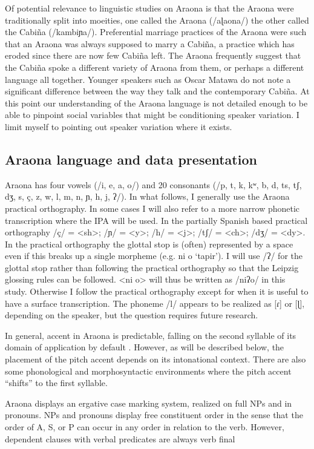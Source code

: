 \documentclass[output=paper,hidelinks]{langscibook}
\begin{document}
Of potential relevance to linguistic studies on Araona is that the Araona were traditionally split into moeities, one called the Araona (/aɭaona/) the other called the Cabiña (/kambiɲa/). Preferential marriage practices of the Araona were such that an Araona was always supposed to marry a Cabiña, a practice which has eroded since there are now few Cabiña left. The Araona frequently suggest that the Cabiña spoke a different variety of Araona from them, or perhaps a different language all together. Younger speakers such as Oscar Matawa do not note a significant difference between the way they talk and the contemporary Cabiña. At this point our understanding of the Araona language is not detailed enough to be able to pinpoint social variables that might be conditioning speaker variation. I limit myself to pointing out speaker variation where it exists. 


\subsection{Araona language and data presentation}

Araona has four vowels (/i, e, a, o/) and 20 consonants (/p, t, k, kʷ, b, d, ts, tʃ, dʒ, s, ç, z, w, l, m, n, ɲ, h, j, ʔ/). In what follows, I generally use the Araona practical orthography. In some cases I will also refer to a more narrow phonetic transcription where the IPA will be used. In the partially Spanish based practical orthography /ç/ = <sh>; /ɲ/  = <y>;  /h/ = <j>; /tʃ/ = <ch>; /dʒ/ = <dy>. In the practical orthography the glottal stop is (often) represented by a space even if this breaks up a single morpheme (e.g. ni o `tapir'). I will use /ʔ/ for the glottal stop rather than following the practical orthography so that the Leipzig glossing rules can be followed. <ni o> will thus be written as /niʔo/ in this study. Otherwise I follow the practical orthography except for when it is useful to have a surface transcription. The phoneme /l/ appears to be realized as [ɾ] or [ɭ], depending on the speaker, but the question requires future research. 

In general, accent in Araona is predictable, falling on the second syllable of its domain of application by default \citep{pitmanpitman1976}. However, as will be described below, the placement of the pitch accent depends on its intonational context. There are also some phonological and morphosyntactic environments where the pitch accent ``shifts'' to the first syllable.

Araona displays an ergative case marking system, realized on full NPs and in pronouns. NPs and pronouns display free constituent order in the sense that the order of A, S, or P can occur in any order in relation to the verb. However, dependent clauses with verbal predicates are always verb final \citep{emkow:2006:araona, emkow:2019:araonarepublish}
\end{document}
